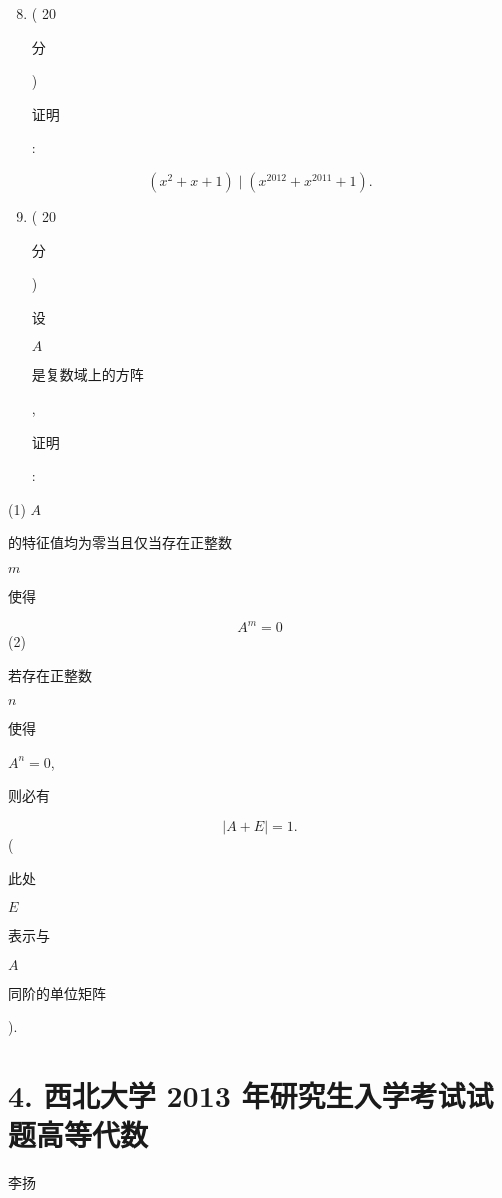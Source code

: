 \documentclass[10pt]{article}
\begin{document}
\begin{enumerate}
  \setcounter{enumi}{7}
  \item ( 20 \begin{CJK}{UTF8}{mj}分\end{CJK}) \begin{CJK}{UTF8}{mj}证明\end{CJK}:
\end{enumerate}
$$
\left(x^{2}+x+1\right) \mid\left(x^{2012}+x^{2011}+1\right) .
$$

\begin{enumerate}
  \setcounter{enumi}{8}
  \item ( 20 \begin{CJK}{UTF8}{mj}分\end{CJK}) \begin{CJK}{UTF8}{mj}设\end{CJK} $A$ \begin{CJK}{UTF8}{mj}是复数域上的方阵\end{CJK}, \begin{CJK}{UTF8}{mj}证明\end{CJK}:
\end{enumerate}
(1) $A$ \begin{CJK}{UTF8}{mj}的特征值均为零当且仅当存在正整数\end{CJK} $m$ \begin{CJK}{UTF8}{mj}使得\end{CJK}
$$
A^{m}=0
$$
(2) \begin{CJK}{UTF8}{mj}若存在正整数\end{CJK} $n$ \begin{CJK}{UTF8}{mj}使得\end{CJK} $A^{n}=0$, \begin{CJK}{UTF8}{mj}则必有\end{CJK}
$$
|A+E|=1 .
$$
(\begin{CJK}{UTF8}{mj}此处\end{CJK} $E$ \begin{CJK}{UTF8}{mj}表示与\end{CJK} $A$ \begin{CJK}{UTF8}{mj}同阶的单位矩阵\end{CJK}).

\section{4. 西北大学 2013 年研究生入学考试试题高等代数}
\begin{CJK}{UTF8}{mj}李扬\end{CJK}
\end{document}
